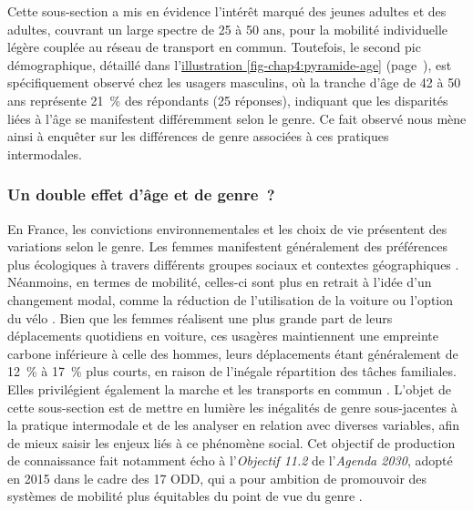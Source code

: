 \begin{refsegment}
Cette sous-section a mis en évidence l'intérêt marqué des jeunes adultes et des adultes, couvrant un large spectre de 25 à 50 ans, pour la mobilité individuelle légère couplée au réseau de transport en commun. Toutefois, le second pic démographique, détaillé dans l'\hyperref[fig-chap4:pyramide-age]{illustration \ref{fig-chap4:pyramide-age}} (page~\pageref{fig-chap4:pyramide-age}), est spécifiquement observé chez les usagers masculins, où la tranche d'âge de 42 à 50 ans représente 21~\% des répondants (25 réponses), indiquant que les disparités liées à l'âge se manifestent différemment selon le genre. Ce fait observé nous mène ainsi à enquêter sur les différences de genre associées à ces pratiques intermodales.%

\subsubsection*{Un double effet d'âge et de genre~?
    \label{chap4:demographie-genre}
    }

En France, les convictions environnementales et les choix de vie présentent des variations selon le genre. Les femmes manifestent généralement des préférences plus écologiques à travers différents groupes sociaux et contextes géographiques \textcolor{blue}{\autocite[29]{pech_femmes_2021}}. Néanmoins, en termes de mobilité, celles-ci sont plus en retrait à l'idée d'un changement modal, comme la réduction de l’utilisation de la voiture ou l'option du vélo \textcolor{blue}{\autocite[25]{pech_femmes_2021}}. Bien que les femmes réalisent une plus grande part de leurs déplacements quotidiens en voiture, ces usagères maintiennent une empreinte carbone inférieure à celle des hommes, leurs déplacements étant généralement de 12~\% à 17~\% plus courts, en raison de l'inégale répartition des tâches familiales. Elles privilégient également la marche et les transports en commun \textcolor{blue}{\autocite[6]{shaw_beyond_2020}}. L'objet de cette sous-section est de mettre en lumière les inégalités de genre sous-jacentes à la pratique intermodale et de les analyser en relation avec diverses variables, afin de mieux saisir les enjeux liés à ce phénomène social. Cet objectif de production de connaissance fait notamment écho à l'\textsl{Objectif 11.2} de l'\textsl{Agenda 2030}, adopté en 2015 dans le cadre des 17 \acrfull{ODD}, qui a pour ambition de promouvoir des systèmes de mobilité plus équitables du point de vue du genre \textcolor{blue}{\autocite{united_nations_transforming_2015}}.%


\end{refsegment}
